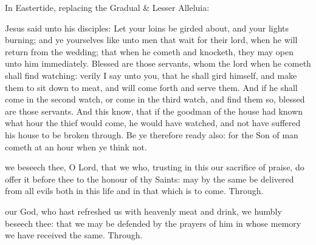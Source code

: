 
\begin{rubric}
{In Eastertide, replacing the Gradual \& Lesser Alleluia:}
\end{rubric}

\vspace{-1ex}


\label{CommonConfessorNotBishopIGospel}
 Jesus said unto his disciples: Let your loins be girded about, and your lights burning; and ye yourselves like unto men that wait for their lord, when he will return from the wedding; that when he cometh and knocketh, they may open unto him immediately. Blessed are those servants, whom the lord when he cometh shall find watching: verily I say unto you, that he shall gird himself, and make them to sit down to meat, and will come forth and serve them. And if he shall come in the second watch, or come in the third watch, and find them so, blessed are those servants. And this know, that if the goodman of the house had known what hour the thief would come, he would have watched, and not have suffered his house to be broken through. Be ye therefore ready also: for the Son of man cometh at an hour when ye think not.


\secret
{} we beseech thee, O Lord, that we who, trusting in this our sacrifice of praise, do offer it before thee to the honour of thy Saints: may by the same be delivered from all evils both in this life and in that which is to come. Through.


\postcommunion
{} our God, who hast refreshed us with heavenly meat and drink, we humbly beseech thee: that we may be defended by the prayers of him in whose memory we have received the same. Through.


